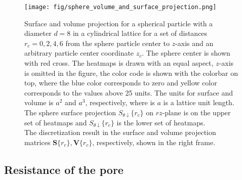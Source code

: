 \documentclass[10pt, a4paper]{article}
\begin{document}
\begin{figure}[H]
    \centering
    \texttt{[image: fig/sphere\_volume\_and\_surface\_projection.png]}
    \caption{
        Surface and volume projection for a spherical particle with a diameter $d=8$ in a cylindrical lattice for a set of distances $r_c = {0, 2, 4, 6}$ from the sphere particle center to $z$-axis and an arbitrary particle center coordinate $z_c$.
        The sphere center is shown with red cross.
        The heatmaps is drawn with an equal aspect, $z$-axis is omitted in the figure, the color code is shown with the colorbar on top, where the blue color corresponds to zero and yellow color corresponds to the values above 25 units.
        The units for surface and volume is $a^2$ and $a^3$, respectively, where is $a$ is a lattice unit length.
        The sphere surface projection $S_{\theta \downarrow}\{r_c\}$ on $rz$-plane is on the upper set of heatmaps and $S_{\theta \downarrow}\{r_c\}$ is the lower set of heatmaps.
        \\
        The discretization result in the surface and volume projection matrices $\bm{S}\{r_c\}, \bm{V}\{r_c\}$, respectively, shown in the right frame.
    }
    \label{fig:sphere_volume_and_surface_projection}
\end{figure}


\subsection*{Resistance of the pore}
\end{document}
